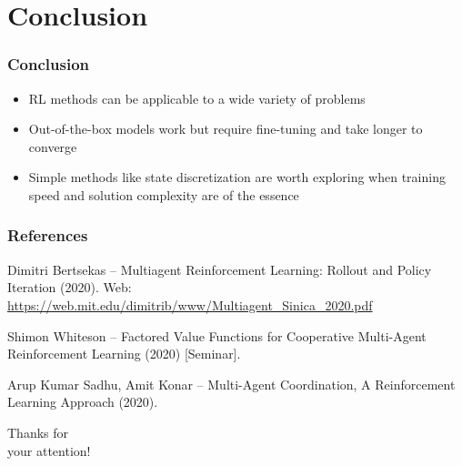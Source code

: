 \documentclass{beamer}
\begin{document}


    \section{Conclusion}

    \begin{frame}
        \frametitle{Conclusion}
        \begin{itemize}
            \item RL methods can be applicable to
            a wide variety of problems

            \item Out-of-the-box models work but
            require fine-tuning and take
            longer to converge

            \item Simple methods like state discretization
            are worth exploring when training speed and
            solution complexity are of the essence

        \end{itemize}
    \end{frame}


    \begin{frame}
        \frametitle{References}
        \footnotesize{
            \begin{thebibliography}{10}

                \label{bert20}
                Dimitri Bertsekas -- Multiagent Reinforcement Learning: Rollout and Policy Iteration (2020). Web:
                \url{https://web.mit.edu/dimitrib/www/Multiagent_Sinica_2020.pdf}

                \label{whiteson20}
                Shimon Whiteson -- Factored Value Functions for Cooperative Multi-Agent Reinforcement Learning (2020) [Seminar].


                \label{sadhu20}
                Arup Kumar Sadhu, Amit Konar --
                Multi-Agent Coordination,
                A Reinforcement Learning Approach (2020).


            \end{thebibliography}
        }
    \end{frame}


    \begin{frame}

        \begin{center}
            \Huge Thanks for
            \\
            your attention!
        \end{center}

    \end{frame}

\end{document}
